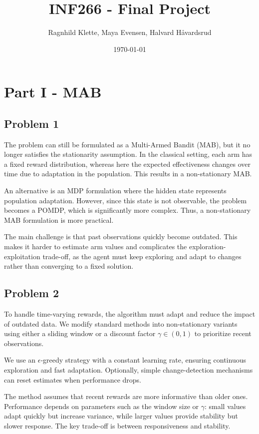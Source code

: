 \documentclass{article}
\title{INF266 - Final Project}
\author{Ragnhild Klette, Maya Evensen, Halvard Håvardsrud}
\date{\today}
\begin{document}
\maketitle

\section*{Part I - MAB}

\subsection*{Problem 1}
The problem can still be formulated as a Multi-Armed Bandit (MAB), but it no longer satisfies the stationarity assumption. 
In the classical setting, each arm has a fixed reward distribution, whereas here the expected effectiveness changes over time due to adaptation in the population. 
This results in a non-stationary MAB.

An alternative is an MDP formulation where the hidden state represents population adaptation. 
However, since this state is not observable, the problem becomes a POMDP, which is significantly more complex. 
Thus, a non-stationary MAB formulation is more practical.

The main challenge is that past observations quickly become outdated. 
This makes it harder to estimate arm values and complicates the exploration-exploitation trade-off, as the agent must keep exploring and adapt to changes rather than converging to a fixed solution.

\subsection*{Problem 2}
To handle time-varying rewards, the algorithm must adapt and reduce the impact of outdated data. 
We modify standard methods into non-stationary variants using either a sliding window or a discount factor $\gamma \in (0,1)$ to prioritize recent observations.

We use an $\epsilon$-greedy strategy with a constant learning rate, ensuring continuous exploration and fast adaptation. 
Optionally, simple change-detection mechanisms can reset estimates when performance drops.

The method assumes that recent rewards are more informative than older ones. 
Performance depends on parameters such as the window size or $\gamma$: small values adapt quickly but increase variance, while larger values provide stability but slower response. 
The key trade-off is between responsiveness and stability.
\end{document}
